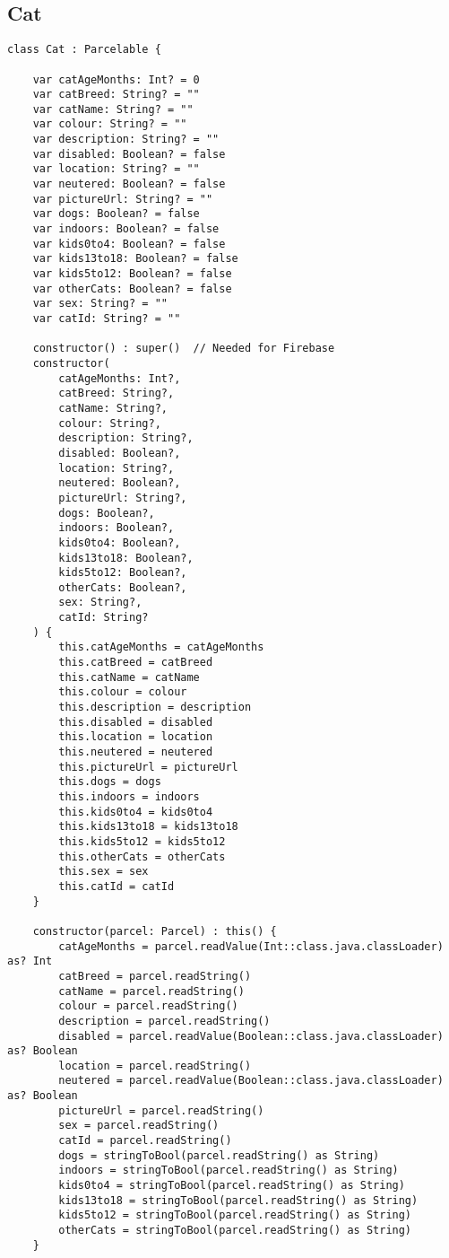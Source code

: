 \subsection{Cat}
\begin{verbatim}
class Cat : Parcelable {

    var catAgeMonths: Int? = 0
    var catBreed: String? = ""
    var catName: String? = ""
    var colour: String? = ""
    var description: String? = ""
    var disabled: Boolean? = false
    var location: String? = ""
    var neutered: Boolean? = false
    var pictureUrl: String? = ""
    var dogs: Boolean? = false
    var indoors: Boolean? = false
    var kids0to4: Boolean? = false
    var kids13to18: Boolean? = false
    var kids5to12: Boolean? = false
    var otherCats: Boolean? = false
    var sex: String? = ""
    var catId: String? = ""

    constructor() : super()  // Needed for Firebase
    constructor(
        catAgeMonths: Int?,
        catBreed: String?,
        catName: String?,
        colour: String?,
        description: String?,
        disabled: Boolean?,
        location: String?,
        neutered: Boolean?,
        pictureUrl: String?,
        dogs: Boolean?,
        indoors: Boolean?,
        kids0to4: Boolean?,
        kids13to18: Boolean?,
        kids5to12: Boolean?,
        otherCats: Boolean?,
        sex: String?,
        catId: String?
    ) {
        this.catAgeMonths = catAgeMonths
        this.catBreed = catBreed
        this.catName = catName
        this.colour = colour
        this.description = description
        this.disabled = disabled
        this.location = location
        this.neutered = neutered
        this.pictureUrl = pictureUrl
        this.dogs = dogs
        this.indoors = indoors
        this.kids0to4 = kids0to4
        this.kids13to18 = kids13to18
        this.kids5to12 = kids5to12
        this.otherCats = otherCats
        this.sex = sex
        this.catId = catId
    }

    constructor(parcel: Parcel) : this() {
        catAgeMonths = parcel.readValue(Int::class.java.classLoader) as? Int
        catBreed = parcel.readString()
        catName = parcel.readString()
        colour = parcel.readString()
        description = parcel.readString()
        disabled = parcel.readValue(Boolean::class.java.classLoader) as? Boolean
        location = parcel.readString()
        neutered = parcel.readValue(Boolean::class.java.classLoader) as? Boolean
        pictureUrl = parcel.readString()
        sex = parcel.readString()
        catId = parcel.readString()
        dogs = stringToBool(parcel.readString() as String)
        indoors = stringToBool(parcel.readString() as String)
        kids0to4 = stringToBool(parcel.readString() as String)
        kids13to18 = stringToBool(parcel.readString() as String)
        kids5to12 = stringToBool(parcel.readString() as String)
        otherCats = stringToBool(parcel.readString() as String)
    }


\end{verbatim}
